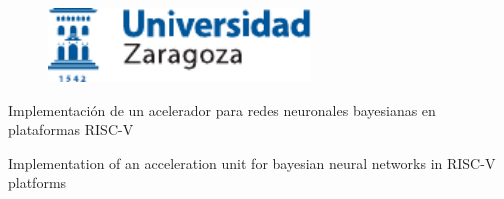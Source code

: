 \documentclass[a4paper,12pt,twoside,hidelinks,openright]{report}
\begin{document}

\begin{titlepage}

\vspace*{-4mm}
\begin{figure}[!h]
  \centering
	\includegraphics[width=69.62mm]{Imagenes/UnizarLogo}
\end{figure}

\vspace*{17mm}

\fontsize{28pt}{28pt}\selectfont
\begin{center}
\setlength{\fboxsep}{3.4mm}
\end{center}

\vspace*{5mm}


\fontsize{20pt}{20pt}\selectfont
\begin{center}
Implementación de un acelerador para redes neuronales bayesianas en plataformas RISC-V
\end{center}
\baselineskip 20pt
\begin{center}
Implementation of an acceleration unit for bayesian neural networks in RISC-V platforms
\end{center}

\vspace*{1cm} 
\baselineskip 36pt
\begin{center}
\fontsize{12pt}{12pt}\selectfont
{}
\vspace*{3.65mm} 
\fontsize{18pt}{18pt}\selectfont
{}
\vspace*{1cm}
\baselineskip 36pt
\fontsize{12pt}{12pt}\selectfont
{}
\vspace*{3.56mm}
\fontsize{14pt}{14pt}\selectfont
{}
\vspace*{1cm}
\baselineskip 36pt
\fontsize{12pt}{12pt}\selectfont
{}
\vspace*{3.56mm}
\fontsize{14pt}{14pt}\selectfont
{}


\end{center}
\end{titlepage}
\end{document}
